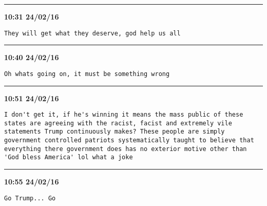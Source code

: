 \hrule%

\begin{adjustwidth}{0cm}{0cm}
\footnotesize \textbf{10:31 24/02/16}

\begin{lstlisting}[breaklines, breakatwhitespace, basicstyle=\small, frame=leftline]
They will get what they deserve, god help us all
\end{lstlisting}
\end{adjustwidth}

\hrule%

\begin{adjustwidth}{0cm}{0cm}
\footnotesize \textbf{10:40 24/02/16}

\begin{lstlisting}[breaklines, breakatwhitespace, basicstyle=\small, frame=leftline]
Oh whats going on, it must be something wrong
\end{lstlisting}
\end{adjustwidth}

\hrule%

\begin{adjustwidth}{0cm}{0cm}
\footnotesize \textbf{10:51 24/02/16}

\begin{lstlisting}[breaklines, breakatwhitespace, basicstyle=\small, frame=leftline]
I don't get it, if he's winning it means the mass public of these states are agreeing with the racist, facist and extremely vile statements Trump continuously makes? These people are simply government controlled patriots systematically taught to believe that everything there government does has no exterior motive other than 'God bless America' lol what a joke
\end{lstlisting}
\end{adjustwidth}

\hrule%

\begin{adjustwidth}{0cm}{0cm}
\footnotesize \textbf{10:55 24/02/16}

\begin{lstlisting}[breaklines, breakatwhitespace, basicstyle=\small, frame=leftline]
Go Trump... Go
\end{lstlisting}
\end{adjustwidth}

